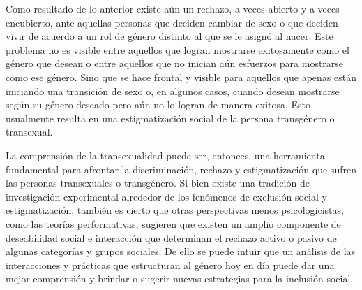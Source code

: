 Como resultado de lo anterior existe aún un rechazo, a veces abierto y a veces
encubierto, ante aquellas personas que deciden cambiar de sexo o que deciden
vivir de acuerdo a un rol de género distinto al que se le asignó al nacer.
Este problema no es visible entre aquellos que logran mostrarse exitosamente
como el género que desean o entre aquellos que no inician aún esfuerzos para
mostrarse como ese género.
Sino que se hace frontal y visible para aquellos que apenas están iniciando una
transición de sexo o, en algunos casos, cuando desean mostrarse según su género
deseado pero aún no lo logran de manera exitosa.
Esto usualmente resulta en una estigmatización social de la persona transgénero
o transexual.

La comprensión de la transexualidad puede ser, entonces, una herramienta
fundamental para afrontar la discriminación, rechazo y estigmatización que
sufren las personas transexuales o transgénero. Si bien existe una tradición de
investigación experimental alrededor de los fenómenos de exclusión social y
estigmatización, también es cierto que otras perspectivas menos psicologicistas,
como las teorías performativas, sugieren que existen un amplio componente de
deseabilidad social e interacción que determinan el rechazo activo o pasivo de
algunas categorías y grupos sociales. De ello se puede intuir que un análisis de
las interacciones y prácticas que estructuran al género hoy en día puede dar una
mejor comprensión y brindar o sugerir nuevas estrategias para la inclusión
social.

